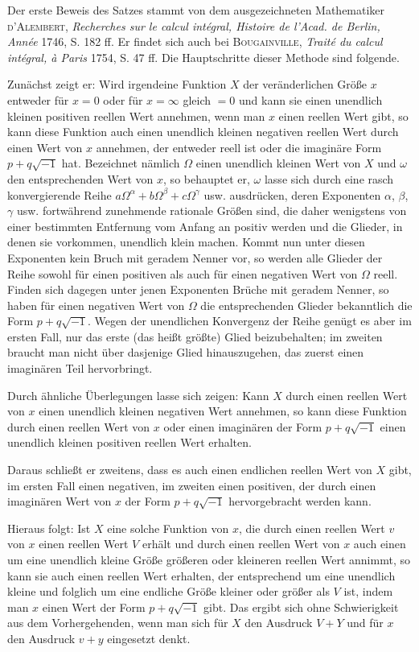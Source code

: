 Der erste Beweis des Satzes stammt von dem ausgezeichneten Mathematiker \textsc{d'Alembert}, \textit{Recherches sur le calcul intégral, Histoire de l'Acad. de Berlin, Année} 1746, S. 182 ff. Er findet sich auch bei \textsc{Bougainville}, \textit{Traité du calcul intégral, à Paris} 1754, S. 47 ff. Die Hauptschritte dieser Methode sind folgende.

Zunächst zeigt er: Wird irgendeine Funktion $X$ der veränderlichen Größe $x$ entweder für $x=0$ oder für $x=\infty$ gleich $=0$ und kann sie einen unendlich kleinen positiven reellen Wert annehmen, wenn man $x$ einen reellen Wert gibt, so kann diese Funktion auch einen unendlich kleinen negativen reellen Wert durch einen Wert von $x$ annehmen, der entweder reell ist oder die imaginäre Form $p+q\sqrt{-1}$ hat. Bezeichnet nämlich $\Omega$ einen unendlich kleinen Wert von $X$ und $\omega$ den entsprechenden Wert von $x$, so behauptet er, $\omega$ lasse sich durch eine rasch konvergierende Reihe $a\Omega^\alpha+b\Omega^\beta+c\Omega^\gamma$ usw. ausdrücken, deren Exponenten $\alpha$, $\beta$, $\gamma$ usw. fortwährend zunehmende rationale Größen sind, die daher wenigstens von einer bestimmten Entfernung vom Anfang an positiv werden und die Glieder, in denen sie vorkommen, unendlich klein machen. Kommt nun unter diesen Exponenten kein Bruch mit geradem Nenner vor, so werden alle Glieder der Reihe sowohl für einen positiven als auch für einen negativen Wert von $\Omega$ reell. Finden sich dagegen unter jenen Exponenten Brüche mit geradem Nenner, so haben für einen negativen Wert von $\Omega$ die entsprechenden Glieder bekanntlich die Form $p+q\sqrt{-1}$. Wegen der unendlichen Konvergenz der Reihe genügt es aber im ersten Fall, nur das erste (das heißt größte) Glied beizubehalten; im zweiten braucht man nicht über dasjenige Glied hinauszugehen, das zuerst einen imaginären Teil hervorbringt.

Durch ähnliche Überlegungen lasse sich zeigen: Kann $X$ durch einen reellen Wert von $x$ einen unendlich kleinen negativen Wert annehmen, so kann diese Funktion durch einen reellen Wert von $x$ oder einen imaginären der Form $p+q\sqrt{-1}$ einen unendlich kleinen positiven reellen Wert erhalten.

Daraus schließt er zweitens, dass es auch einen endlichen reellen Wert von $X$ gibt, im ersten Fall einen negativen, im zweiten einen positiven, der durch einen imaginären Wert von $x$ der Form $p+q\sqrt{-1}$ hervorgebracht werden kann.

Hieraus folgt: Ist $X$ eine solche Funktion von $x$, die durch einen reellen Wert $v$ von $x$ einen reellen Wert $V$ erhält und durch einen reellen Wert von $x$ auch einen um eine unendlich kleine Größe größeren oder kleineren reellen Wert annimmt, so kann sie auch einen reellen Wert erhalten, der entsprechend um eine unendlich kleine und folglich um eine endliche Größe kleiner oder größer als $V$ ist, indem man $x$ einen Wert der Form $p+q\sqrt{-1}$ gibt. Das ergibt sich ohne Schwierigkeit aus dem Vorhergehenden, wenn man sich für $X$ den Ausdruck $V+Y$ und für $x$ den Ausdruck $v+y$ eingesetzt denkt.

